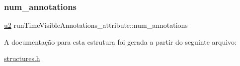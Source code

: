 \subsubsection{\texorpdfstring{num\+\_\+annotations}{num\_annotations}}
{\footnotesize\ttfamily \hyperlink{lista__operandos_8h_a732cde1300aafb73b0ea6c2558a7a54f}{u2} run\+Time\+Visible\+Annotations\+\_\+attribute\+::num\+\_\+annotations}



A documentação para esta estrutura foi gerada a partir do seguinte arquivo\+:\begin{DoxyCompactItemize}
\item 
\hyperlink{structures_8h}{structures.\+h}\end{DoxyCompactItemize}
